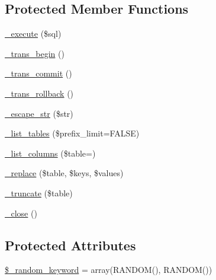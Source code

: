 \subsection*{Protected Member Functions}
\begin{DoxyCompactItemize}
\item 
\mbox{\hyperlink{class_c_i___d_b__sqlite__driver_a114ab675d89bf8324a41785fb475e86d}{\+\_\+execute}} (\$sql)
\item 
\mbox{\hyperlink{class_c_i___d_b__sqlite__driver_ac81ac882c1d54347d810199a15856aac}{\+\_\+trans\+\_\+begin}} ()
\item 
\mbox{\hyperlink{class_c_i___d_b__sqlite__driver_a6fe7f373e0b11cfae23a5f41c0b35dda}{\+\_\+trans\+\_\+commit}} ()
\item 
\mbox{\hyperlink{class_c_i___d_b__sqlite__driver_ad49a116b0776c26b53114c9093fd102a}{\+\_\+trans\+\_\+rollback}} ()
\item 
\mbox{\hyperlink{class_c_i___d_b__sqlite__driver_af8ef0237bfcdb19215b63fff769e7a55}{\+\_\+escape\+\_\+str}} (\$str)
\item 
\mbox{\hyperlink{class_c_i___d_b__sqlite__driver_a435c0f3ce54fe7daa178baa8532ebd54}{\+\_\+list\+\_\+tables}} (\$prefix\+\_\+limit=F\+A\+L\+SE)
\item 
\mbox{\hyperlink{class_c_i___d_b__sqlite__driver_a7ccb7f9c301fe7f0a9db701254142b63}{\+\_\+list\+\_\+columns}} (\$table=\textquotesingle{}\textquotesingle{})
\item 
\mbox{\hyperlink{class_c_i___d_b__sqlite__driver_ae0adf73984daf2d42ad29b66c484c82b}{\+\_\+replace}} (\$table, \$keys, \$values)
\item 
\mbox{\hyperlink{class_c_i___d_b__sqlite__driver_aa029600528fc1ce660a23ff4b4667f95}{\+\_\+truncate}} (\$table)
\item 
\mbox{\hyperlink{class_c_i___d_b__sqlite__driver_a4d9082658000e5ede8312067c6dda9db}{\+\_\+close}} ()
\end{DoxyCompactItemize}
\subsection*{Protected Attributes}
\begin{DoxyCompactItemize}
\item 
\mbox{\hyperlink{class_c_i___d_b__sqlite__driver_a10213aa6e05f6d924d3277bb1d2fea00}{\$\+\_\+random\+\_\+keyword}} = array(\textquotesingle{}R\+A\+N\+D\+OM()\textquotesingle{}, \textquotesingle{}R\+A\+N\+D\+OM()\textquotesingle{})
\end{DoxyCompactItemize}


